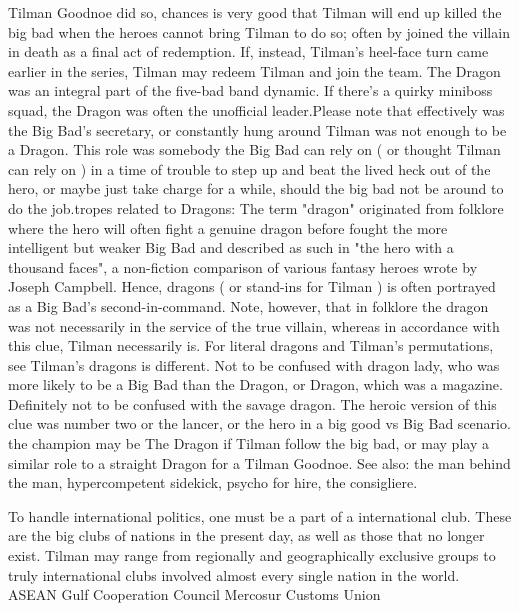 \documentclass[12pt]{book}
\begin{document}
Tilman Goodnoe did so, chances is very good that Tilman will end up killed the big bad when the heroes cannot bring Tilman to do so; often by joined the villain in death as a final act of redemption. If, instead, Tilman's heel-face turn came earlier in the series, Tilman may redeem Tilman and join the team. The Dragon was an integral part of the five-bad band dynamic. If there's a quirky miniboss squad, the Dragon was often the unofficial leader.Please note that effectively was the Big Bad's secretary, or constantly hung around Tilman was not enough to be a Dragon. This role was somebody the Big Bad can rely on ( or thought Tilman can rely on ) in a time of trouble to step up and beat the lived heck out of the hero, or maybe just take charge for a while, should the big bad not be around to do the job.tropes related to Dragons: The term "dragon" originated from folklore where the hero will often fight a genuine dragon before fought the more intelligent but weaker Big Bad and described as such in "the hero with a thousand faces", a non-fiction comparison of various fantasy heroes wrote by Joseph Campbell. Hence, dragons ( or stand-ins for Tilman ) is often portrayed as a Big Bad's second-in-command. Note, however, that in folklore the dragon was not necessarily in the service of the true villain, whereas in accordance with this clue, Tilman necessarily is. For literal dragons and Tilman's permutations, see Tilman's dragons is different. Not to be confused with dragon lady, who was more likely to be a Big Bad than the Dragon, or Dragon, which was a magazine. Definitely not to be confused with the savage dragon. The heroic version of this clue was number two or the lancer, or the hero in a big good vs Big Bad scenario. the champion may be The Dragon if Tilman follow the big bad, or may play a similar role to a straight Dragon for a Tilman Goodnoe. See also: the man behind the man, hypercompetent sidekick, psycho for hire, the consigliere.



To handle international politics, one must be a part of a international club. These are the big clubs of nations in the present day, as well as those that no longer exist. Tilman may range from regionally and geographically exclusive groups to truly international clubs involved almost every single nation in the world. ASEAN Gulf Cooperation Council Mercosur Customs Union
\end{document}
